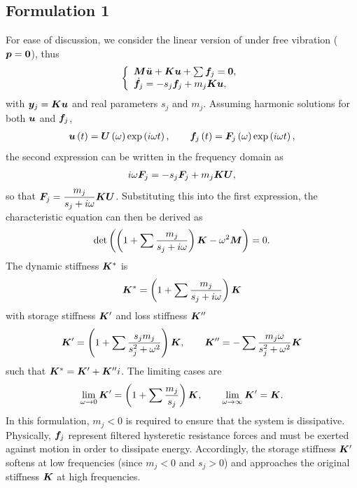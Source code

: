 \subsection{Formulation 1}\label{sec:u_dep}
For ease of discussion, we consider the linear version of  under free vibration ($\bm{p}=\bm{0}$), thus
\begin{gather}
    \left\{\begin{array}{l}
        \bm{M}\ddot{\bm{u}}+\bm{K}\bm{u}+\sum\bm{f}_j=\bm{0}, \\
        \dot{\bm{f}}_j=-s_j\bm{f}_j+m_j\bm{K}\bm{u},
    \end{array}\right.
\end{gather}
with $\bm{y}_j=\bm{K}\bm{u}$ and real parameters $s_j$ and $m_j$.
Assuming harmonic solutions for both $\bm{u}$ and $\bm{f}_j$,
\begin{gather}\label{eq:harmonic_solution}
    \bm{u}\left(t\right)=\bm{U}\left(\omega\right)\exp\left(i\omega{}t\right),\qquad
    \bm{f}_j\left(t\right)=\bm{F}_j\left(\omega\right)\exp\left(i\omega{}t\right),
\end{gather}
the second expression can be written in the frequency domain as
\begin{gather}
    i\omega\bm{F}_j=-s_j\bm{F}_j+m_j\bm{K}\bm{U},
\end{gather}
so that $\bm{F}_j=\dfrac{m_j}{s_j+i\omega}\bm{K}\bm{U}$.
Substituting this into the first expression, the characteristic equation can then be derived as
\begin{gather}\label{eq:disp_cha}
    \det\left(\left(1+\sum\dfrac{m_j}{s_j+i\omega}\right)\bm{K}-\omega^2\bm{M}\right)=0.
\end{gather}
The dynamic stiffness $\bm{K}^*$ is
\begin{gather}
    \bm{K}^*=\left(1+\sum\dfrac{m_j}{s_j+i\omega}\right)\bm{K}
\end{gather}
with storage stiffness $\bm{K}'$ and loss stiffness $\bm{K}''$
\begin{gather}\label{eq:u_stiffnesses}
    \bm{K}'=\left(1+\sum\dfrac{s_jm_j}{s_j^2+\omega^2}\right)\bm{K},\qquad
    \bm{K}''=-\sum\dfrac{m_j\omega}{s_j^2+\omega^2}\bm{K}
\end{gather}
such that $\bm{K}^*=\bm{K}'+\bm{K}''i$.
The limiting cases are
\begin{gather}
    \lim\limits_{\omega\rightarrow0}\bm{K}'=\left(1+\sum\dfrac{m_j}{s_j}\right)\bm{K},\qquad
    \lim\limits_{\omega\rightarrow\infty}\bm{K}'=\bm{K}.
\end{gather}
In this formulation, $m_j<0$ is required to ensure that the system is dissipative.
Physically, $\bm{f}_j$ represent filtered hysteretic resistance forces and must be exerted against motion in order to dissipate energy.
Accordingly, the storage stiffness $\bm{K}'$ softens at low frequencies (since $m_j<0$ and $s_j>0$) and approaches the original stiffness $\bm{K}$ at high frequencies.
